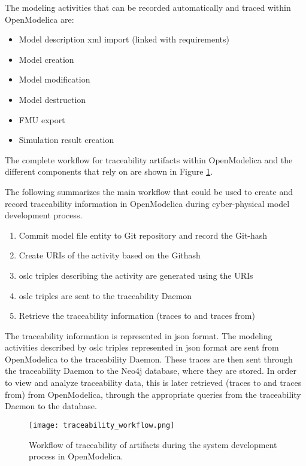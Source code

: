 The modeling activities that can be recorded automatically and traced within OpenModelica are:

\begin{itemize}
\item Model description \acrshort{xml} import (linked with requirements)
\item Model creation
\item Model modification
\item Model destruction
\item FMU export
\item Simulation result creation

\end{itemize}
The complete workflow for traceability artifacts within OpenModelica and the different components that rely on are shown in Figure \ref{fig:traceabilityworkflow}.

The following summarizes the main workflow that could be used to create and record traceability
information in OpenModelica during cyber-physical model development process.

\begin{enumerate}
\item Commit model file entity to Git repository and record the Git-hash
\item Create URIs of the activity based on the Git\-hash
\item \acrshort{oslc} triples describing the activity are generated using the URIs
\item \acrshort{oslc} triples are sent to the traceability Daemon
\item Retrieve the traceability information (traces to and traces from)

\end{enumerate}

The traceability information is represented in \acrshort{json} format. The modeling activities described by \acrshort{oslc}
triples represented in \acrshort{json} format are sent from OpenModelica to the traceability Daemon. These traces are then
sent through the traceability Daemon to the Neo4j database, where they are stored. In order to view and analyze
traceability data, this is later retrieved (traces to and traces from) from OpenModelica, through the
appropriate queries from the traceability Daemon to the database. 

\begin{figure}
	\texttt{[image: traceability\_workflow.png]}
	\caption{Workflow of traceability of artifacts during the system development process in OpenModelica.}
	\label{fig:traceabilityworkflow}
\end{figure}


